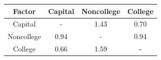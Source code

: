 \begin{table}[!ht]
\setlength\tabcolsep{0.425em}
\setlength\aboverulesep{0pt}
\setlength\belowrulesep{0.2em}
\centering
\begin{threeparttable}
\begin{tabular}{cccc}
\toprule[0.1em]
Factor & Capital & Noncollege & College \\[0.2em]
\midrule[0.075em]
Capital & - & 1.43 & 0.70 \\[0.2em]
Noncollege & 0.94 & - & 0.94 \\[0.2em]
College & 0.66 & 1.59 & - \\[0.2em]
\bottomrule[0.1em]
\end{tabular}
\end{threeparttable}
\end{table}

